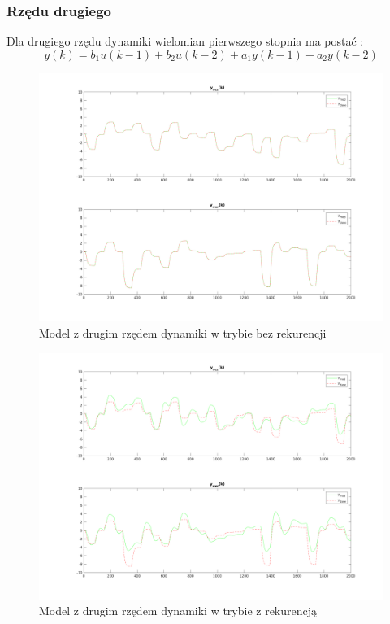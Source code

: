 \documentclass[a4paper, 11pt]{article}
\begin{document}
\subsubsection{Rzędu drugiego}
Dla drugiego rzędu dynamiki wielomian pierwszego stopnia ma postać : 
$$y(k) = b_1u(k-1)+b_2u(k-2) + a_1y(k-1)+a_2y(k-2)$$
\begin{figure}[H]
\centering
\includegraphics[scale=0.50]{dane_dyn_mod_brek_D_2N_1.png}
\caption{Model z drugim rzędem dynamiki w trybie bez rekurencji }
\label{}
\end{figure}
\begin{figure}[H]
\centering
\includegraphics[scale=0.50]{dane_dyn_mod_rek_D_2N_1.png}
\caption{Model z drugim rzędem dynamiki w trybie z rekurencją }
\label{}
\end{figure}
\end{document}
